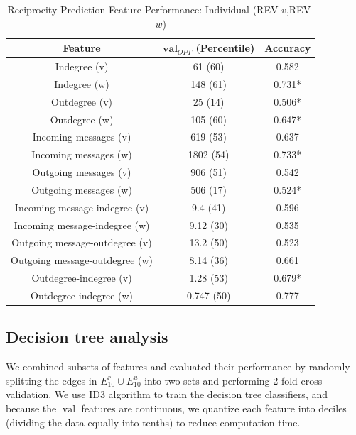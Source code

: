 \documentclass[conference]{IEEEtran}
\begin{document}
\begin{table}[!t]
\renewcommand{\arraystretch}{1.3}
\caption{Reciprocity Prediction Feature Performance: Individual (REV-$v$,REV-$w$)}
\label{table_recresults_indivVW}
\centering
\begin{tabular}{|c||c|c|}
\hline
\bf{Feature} & $\mathbf{val}_{OPT}$ (Percentile) & \bf{Accuracy} \\
\hline
Indegree (v) &  61 (60) & 0.582 \\
Indegree (w) & 148 (61) & 0.731* \\
Outdegree (v) & 25 (14) & 0.506* \\
Outdegree (w) & 105 (60) & 0.647* \\
\hline
Incoming messages (v) & 619 (53) & 0.637 \\
Incoming messages (w) & 1802 (54) & 0.733* \\
Outgoing messages (v) & 906 (51) & 0.542 \\
Outgoing messages (w) & 506 (17) & 0.524* \\
\hline
Incoming message-indegree (v) & 9.4 (41) & 0.596 \\
Incoming message-indegree (w) & 9.12 (30) & 0.535 \\
Outgoing message-outdegree (v) & 13.2 (50) & 0.523 \\
Outgoing message-outdegree (w) & 8.14 (36) & 0.661 \\
\hline
Outdegree-indegree (v) & 1.28 (53) & 0.679* \\
Outdegree-indegree (w) & 0.747 (50) & 0.777 \\
\hline
\end{tabular}
\end{table}

\subsection{Decision tree analysis}

We combined subsets of features and evaluated their performance by randomly splitting the edges in $E^r_{10} \cup E_{10}^u$ into two sets and performing 2-fold cross-validation. 
We use ID3 algorithm to train the decision tree classifiers, and because the $\operatorname{val}$ features are continuous, we quantize each feature into deciles (dividing the data equally into tenths) to reduce computation time.
\end{document}
